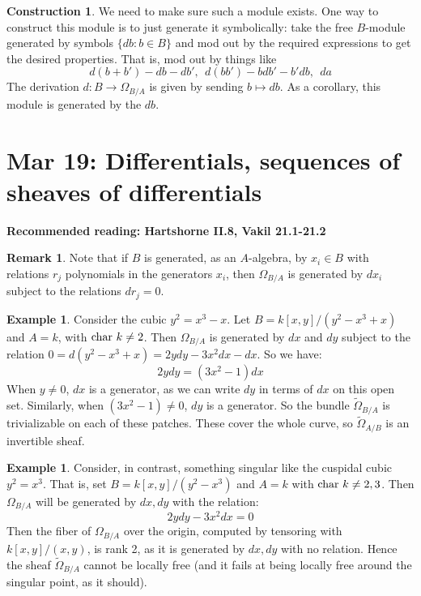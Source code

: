 \documentclass[10pt,reqno]{amsart}
\theoremstyle{definition}
\newtheorem{example}[theorem]{Example}
\newtheorem{construction}[theorem]{Construction}
\newtheorem{remark}[theorem]{Remark}
\theoremstyle{remark}
\numberwithin{equation}{section}
\numberwithin{theorem}{section}
\newcommand*{\red}{\textcolor{red}}
\newcommand{\wt}{\widetilde}
\begin{document}
\begin{construction}
We need to make sure such a module exists. One way to construct this module is to just generate it symbolically: take the free $B$-module generated by symbols $\{db: b \in B\}$ and mod out by the required expressions to get the desired properties. That is, mod out by things like
\[d(b+b') - db - db', \ \ d(bb') - bdb' - b'db, \ \ da\]
The derivation $d: B \to \Omega_{B/A}$ is given by sending $b \mapsto db$. As a corollary, this module is generated by the $db$.
\end{construction}


\section{Mar 19: Differentials, sequences of sheaves of differentials}
\textbf{Recommended reading: Hartshorne II.8, Vakil 21.1-21.2}

\begin{remark} Note that if $B$ is generated, as an $A$-algebra, by $x_i \in B$ with relations $r_j$ polynomials in the generators $x_i$, then $\Omega_{B/A}$ is generated by $dx_i$ subject to the relations $dr_j = 0$.
\end{remark} 

\begin{example} Consider the cubic $y^2 = x^3-x$. Let $B = k[x,y]/(y^2-x^3+x)$ and $A = k$, with $\textup{char } k \ne 2$. Then $\Omega_{B/A}$ is generated by $dx$ and $dy$ subject to the relation $0 = d(y^2-x^3+x) = 2ydy - 3x^2dx - dx$. So we have:
\[2ydy = (3x^2-1)dx\]
When $y \ne 0$, $dx$ is a generator, as we can write $dy$ in terms of $dx$ on this open set. Similarly, when $(3x^2-1) \ne 0$, $dy$ is a generator. So the bundle $\wt{\Omega}_{B/A}$ is trivializable on each of these patches. These cover the whole curve, so $\wt{\Omega}_{A/B}$ is an invertible sheaf. %
\end{example}

\begin{example} Consider, in contrast, something singular like the cuspidal cubic $y^2 = x^3$. That is, set $B = k[x,y]/(y^2 -x^3)$ and $A = k$ with $\textup{char }k \ne 2,3$. Then $\Omega_{B/A}$ will be generated by $dx, dy$ with the relation:
\[2ydy - 3x^2dx = 0\]
Then the fiber of $\Omega_{B/A}$ over the origin, computed by tensoring with $k[x,y]/(x,y)$, is rank 2, as it is generated by $dx,dy$ with no relation. Hence the sheaf $\wt{\Omega}_{B/A}$ cannot be locally free (and it fails at being locally free around the singular point, as it should).
\end{example}
\end{document}
